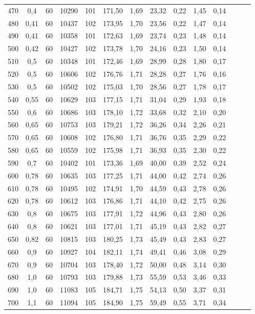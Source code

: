 \begin{table}[h!]
\begin{tabular}{c c c c c c c c c c c c c c}
      470	& 0,4	  & 60	& 10290	& 101	& 171,50    &  1,69  	& 	23,32	&	0,22 &	1,45 & 0,14\\
      480	& 0,41	& 60	& 10437	& 102	& 173,95	  &  1,70  	& 	23,56	&	0,22 &	1,47 & 0,14\\
      490	& 0,41	& 60	& 10358	& 101	& 172,63    &  1,69  	& 	23,74	&	0,23 &	1,48 & 0,14\\
      500	& 0,42	& 60	& 10427	& 102	& 173,78    &  1,70  	& 	24,16	&	0,23 &	1,50 & 0,14\\
      510	& 0,5	  & 60	& 10348	& 101	& 172,46    &  1,69 	& 	28,99	&	0,28 &	1,80 & 0,17\\
      520	& 0,5	  & 60	& 10606	& 102	& 176,76    &  1,71 	& 	28,28	&	0,27 &	1,76 & 0,16\\
      530	& 0,5	  & 60	& 10502	& 102	& 175,03    &  1,70 	& 	28,56	&	0,27 &	1,78 & 0,17\\
      540	& 0,55	& 60	& 10629	& 103	& 177,15	  &  1,71  	& 	31,04	&	0,29 &	1,93 & 0,18\\
      550	& 0,6	  & 60	& 10686	& 103	& 178,10    &  1,72  	& 	33,68	&	0,32 &	2,10 & 0,20\\
      560	& 0,65	& 60	& 10753	& 103	& 179,21    &  1,72  	& 	36,26	&	0,34 &	2,26 & 0,21\\
      570	& 0,65	& 60	& 10608	& 102	& 176,80    &  1,71 	& 	36,76	&	0,35 &	2,29 & 0,22\\
      580	& 0,65	& 60	& 10559	& 102	& 175,98    &  1,71  	& 	36,93	&	0,35 &	2,30 & 0,22\\
      590	& 0,7	  & 60	& 10402	& 101	& 173,36    &  1,69 	& 	40,00	&	0,39 &	2,52 & 0,24\\
      600	& 0,78	& 60	& 10635	& 103	& 177,25	  &  1,71  	& 	44,00	&	0,42 &	2,74 & 0,26\\
      610	& 0,78	& 60	& 10495	& 102	& 174,91    &  1,70  	& 	44,59	&	0,43 &	2,78 & 0,26\\
      620	& 0,78	& 60	& 10612	& 103	& 176,86    &  1,71  	& 	44,10	&	0,42 &	2,75 & 0,26\\
      630	& 0,8	  & 60	& 10675	& 103	& 177,91    &  1,72 	& 	44,96	&	0,43 &	2,80 & 0,26\\
      640	& 0,8	  & 60	& 10621	& 103	& 177,01    &  1,71 	& 	45,19	&	0,43 &	2,82 & 0,27\\
      650	& 0,82	& 60	& 10815	& 103	& 180,25	  &  1,73  	& 	45,49	&	0,43 &	2,83 & 0,27\\
      660	& 0,9	  & 60	& 10927	& 104	& 182,11    &  1,74 	& 	49,41	&	0,46 &	3,08 & 0,29\\
      670	& 0,9	  & 60	& 10704	& 103	& 178,40    &  1,72 	& 	50,00	&	0,48 &	3,14 & 0,30\\
      680	& 1,0	  & 60	& 10793	& 103	& 179,88    &  1,73 	& 	55,59	&	0,53 &	3,46 & 0,33\\
      690	& 1,0	  & 60	& 11083	& 105	& 184,71    &  1,75 	& 	54,13	&	0,50 &	3,37 & 0,31\\
      700	& 1,1	  & 60	& 11094	& 105	& 184,90    &  1,75  	& 	59,49	&	0,55 &	3,71 & 0,34\\
    \bottomrule
  \end{tabular}
\end{table}
